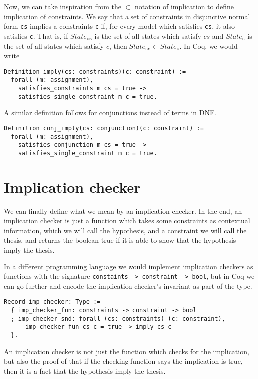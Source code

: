 Now, we can take inspiration from the $\subset$ notation of implication to define implication of 
constraints. We say that a set of constraints in disjunctive normal form \texttt{cs} implies a constraints \texttt{c} if,
for every model which satisfies \texttt{cs}, it also satisfies \texttt{c}. That is, if $State_{\texttt{cs}}$ is the set of
all states which satisfy $cs$ and $State_{\texttt{c}}$ is the set of all states which satisfy $c$, then
$State_{\texttt{cs}} \subset State_{\texttt{c}}$. In Coq, we would write

\begin{verbatim}
Definition imply(cs: constraints)(c: constraint) := 
  forall (m: assignment),
    satisfies_constraints m cs = true ->
    satisfies_single_constraint m c = true.
\end{verbatim}

A similar definition follows for conjunctions instead of terms in DNF.
\begin{verbatim}
Definition conj_imply(cs: conjunction)(c: constraint) := 
  forall (m: assignment),
    satisfies_conjunction m cs = true ->
    satisfies_single_constraint m c = true.
\end{verbatim}

\section{Implication checker}

We can finally define what we mean by an implication checker. In the end, an implication checker is 
just a function which takes some constraints as contextual information, which we will call the 
hypothesis, and a constraint we will call the thesis, and returns the boolean true if it is able to 
show that the hypothesis imply the thesis.

In a different programming language we would implement implication checkers as functions with the 
signature \texttt{constaints -> constraint -> bool}, but in Coq we can go further and encode 
the implication checker's invariant as part of the type.

\begin{verbatim}
Record imp_checker: Type := 
  { imp_checker_fun: constraints -> constraint -> bool
  ; imp_checker_snd: forall (cs: constraints) (c: constraint),
      imp_checker_fun cs c = true -> imply cs c
  }.
\end{verbatim}

An implication checker is not just the function which checks for the implication, but also the proof of
that if the checking function says the implication is true, then it is a fact that the hypothesis 
imply the thesis.

